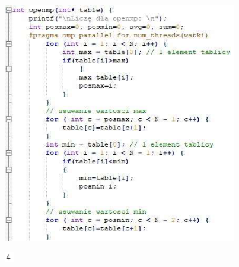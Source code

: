 \documentclass[
]{article}
\begin{document}
\includegraphics[width=4.03333in,height=4.14167in]{vertopal_45f5e71363bf454ba37a280ca069ec4b/media/image20.png}

\includegraphics[width=0.15278in,height=0.18056in]{vertopal_45f5e71363bf454ba37a280ca069ec4b/media/image21.png}
\end{document}
